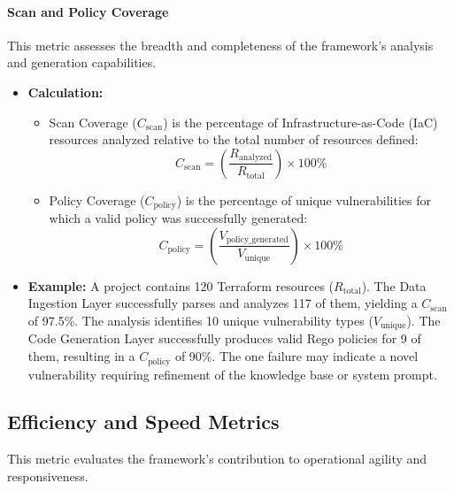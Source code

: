 \paragraph{Scan and Policy Coverage} This metric assesses the breadth and completeness of the framework's analysis and generation capabilities.
\begin{itemize}
    \item \textbf{Calculation:}
        \begin{itemize}
            \item Scan Coverage (\( C_{\text{scan}} \)) is the percentage of Infrastructure-as-Code (IaC) resources analyzed relative to the total number of resources defined:
            \[ C_{\text{scan}} = \left(\frac{R_{\text{analyzed}}}{R_{\text{total}}}\right) \times 100\% \]
            \item Policy Coverage (\( C_{\text{policy}} \)) is the percentage of unique vulnerabilities for which a valid policy was successfully generated:
            \[ C_{\text{policy}} = \left(\frac{V_{\text{policy\_generated}}}{V_{\text{unique}}}\right) \times 100\% \]
        \end{itemize}
    \item \textbf{Example:} A project contains 120 Terraform resources (\( R_{\text{total}} \)). The Data Ingestion Layer successfully parses and analyzes 117 of them, yielding a \( C_{\text{scan}} \) of 97.5\%. The analysis identifies 10 unique vulnerability types (\( V_{\text{unique}} \)). The Code Generation Layer successfully produces valid Rego policies for 9 of them, resulting in a \( C_{\text{policy}} \) of 90\%. The one failure may indicate a novel vulnerability requiring refinement of the knowledge base or system prompt.
\end{itemize}

\subsection*{Efficiency and Speed Metrics}
This metric evaluates the framework's contribution to operational agility and responsiveness.

